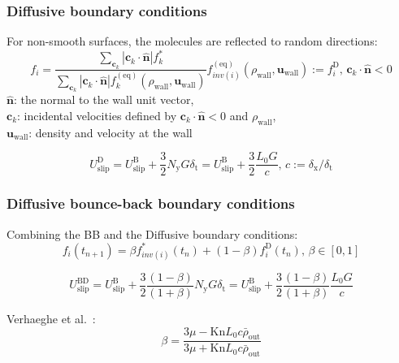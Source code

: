\documentclass{beamer}
\begin{document}
\begin{frame}
 \frametitle{Diffusive boundary conditions}
 For non-smooth surfaces, the molecules are reflected to random directions:
 \begin{equation}
 f_i = \frac{\sum_{\mathbf{c}_k} | \mathbf{c}_k \cdot \hat{\mathbf{n}}| f_k^* }
 { \sum_{\mathbf{c}_k} | \mathbf{c}_k \cdot \hat{\mathbf{n}} | f_k^\mathrm{(eq)}(\rho_\mathrm{wall}, \mathbf{u}_\mathrm{wall})  }
 f_{inv(i)}^{\mathrm{(eq)}}(\rho_\mathrm{wall}, \mathbf{u}_\mathrm{wall}) := f_i^\mathrm{D} \textrm{, \ } \mathbf{c}_k \cdot \hat{\mathbf{n}} < 0
\end{equation}
$\hat{\mathbf{n}}$: the normal to the wall unit vector, \\
$\mathbf{c}_k$: incidental velocities defined by $ \mathbf{c}_k \cdot \hat{\mathbf{n}} < 0$ and $\rho_\mathrm{wall}$,\\
$\mathbf{u}_\mathrm{wall}$: density and velocity at the wall

\begin{equation}
 U_\mathrm{slip}^\mathrm{D} = U_\mathrm{slip}^\mathrm{B} + \frac{3}{2}N_\mathrm{y} G \delta_\mathrm{t} = U_\mathrm{slip}^\mathrm{B} + \frac{3}{2} \frac{L_0 G}{c} \textrm{, \ } c:=\delta_\mathrm{x} / \delta_\mathrm{t}
\end{equation}
\end{frame}

\begin{frame}
 \frametitle{Diffusive bounce-back boundary conditions}
 
 Combining the BB and the Diffusive boundary conditions:
 \begin{equation}
 f_i(t_{n+1}) = \beta f_{inv(i)}^{*} (t_n) + (1-\beta)f_i^\mathrm{D}(t_n) \textrm{, \ } \beta \in [0,1]
\end{equation}

\begin{equation}
 U_\mathrm{slip}^\mathrm{BD} = U_\mathrm{slip}^\mathrm{B} + \frac{3}{2} \frac{(1-\beta)}{(1+\beta)} N_\mathrm{y} G \delta_\mathrm{t}
 = U_\mathrm{slip}^\mathrm{B} + \frac{3}{2} \frac{(1-\beta)}{(1+\beta)} \frac{L_0 G}{c}
\end{equation}

Verhaeghe et al.~\cite{Verhaeghe2009}:
\begin{equation}
 \beta = \frac{3\mu - \mathrm{Kn} L_0 c \bar{\rho}_\mathrm{out} }{3\mu + \mathrm{Kn} L_0 c \bar{\rho}_\mathrm{out} }
 \label{eq:betaBD}
\end{equation}
\end{frame}
\end{document}
